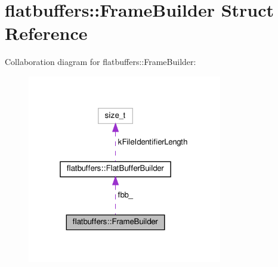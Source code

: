 \hypertarget{structflatbuffers_1_1FrameBuilder}{}\section{flatbuffers\+:\+:Frame\+Builder Struct Reference}
\label{structflatbuffers_1_1FrameBuilder}


Collaboration diagram for flatbuffers\+:\+:Frame\+Builder\+:
\nopagebreak
\begin{figure}[H]
\begin{center}
\leavevmode
\includegraphics[width=241pt]{structflatbuffers_1_1FrameBuilder__coll__graph}
\end{center}
\end{figure}
